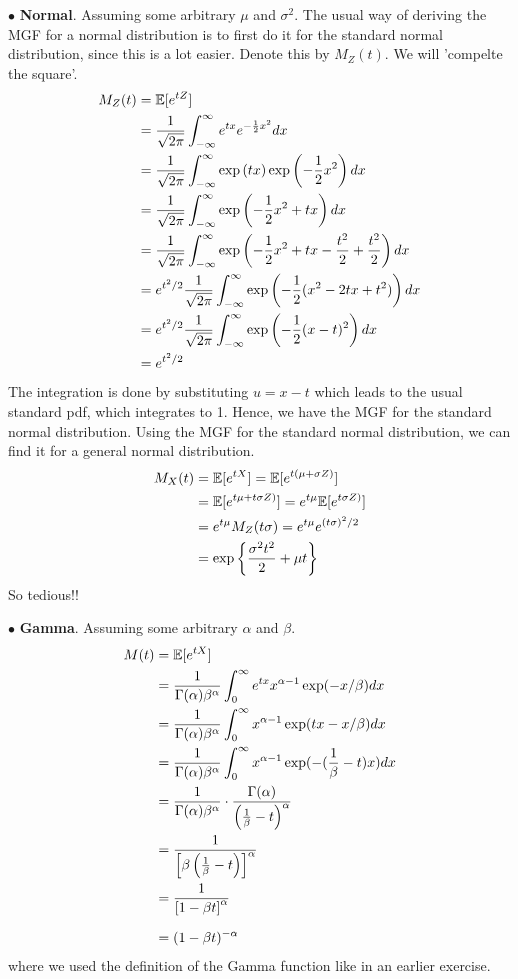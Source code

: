 \bigskip\noindent$\bullet$ \textbf{Normal}. Assuming some arbitrary $\mu$ and $\sigma^2$.
The usual way of deriving the MGF for a normal distribution is to first do it for
the standard normal distribution, since this is a lot easier. Denote this by $M_Z(t)$.
We will 'compelte the square'.
\begin{align*}
    M_Z(t) &= \mathbb{E}[e^{tZ}] \\
    &= \frac{1}{\sqrt{2\pi}}\int_{-\infty}^\infty e^{tx}e^{-\frac{1}{2}x^2}dx \\
    &= \frac{1}{\sqrt{2\pi}}\int_{-\infty}^\infty \exp\left(tx\right)\exp\left(-\frac{1}{2}x^2\right)dx\\
    &= \frac{1}{\sqrt{2\pi}}\int_{-\infty}^\infty \exp\left(-\frac{1}{2}x^2 + tx\right)dx\\
    &= \frac{1}{\sqrt{2\pi}}\int_{-\infty}^\infty \exp\left(-\frac{1}{2}x^2 + tx - \frac{t^2}{2} + \frac{t^2}{2} \right)dx\\
    &= e^{t^2/2}\frac{1}{\sqrt{2\pi}}\int_{-\infty}^\infty \exp\left(-\frac{1}{2}(x^2 - 2tx + t^2)\right)dx \\
    &= e^{t^2/2}\frac{1}{\sqrt{2\pi}}\int_{-\infty}^\infty \exp\left(-\frac{1}{2}(x - t)^2\right)dx \\
    &= e^{t^2/2}
\end{align*}
The integration is done by substituting $u = x-t$ which leads to the usual standard pdf, which
integrates to 1. Hence, we have the MGF for the standard normal distribution. Using the
MGF for the standard normal distribution, we can find it for a general normal distribution.
\begin{align*}
    M_X(t) &= \mathbb{E}[e^{tX}]
    = \mathbb{E}[e^{t(\mu + \sigma Z)}] \\
    &= \mathbb{E}[e^{t\mu + t\sigma Z)}]
    = e^{t\mu}\mathbb{E}[e^{t\sigma Z)}]\\
    &= e^{t\mu}M_Z(t\sigma) = e^{t\mu}e^{(t\sigma)^2/2} \\
    &= \exp\left\{\frac{\sigma^2 t^2}{2} + \mu t\right\}
\end{align*}
So tedious!!

\newpage\noindent
$\bullet$ \textbf{Gamma}. Assuming some arbitrary $\alpha$ and $\beta$.
\begin{align*}
    M(t) &= \E[e^{tX}] \\
    &= \frac{1}{\Gamma(\alpha)\beta^\alpha}\int_{0}^\infty e^{tx}x^{\alpha-1}\exp(-x/\beta)dx \\
    &= \frac{1}{\Gamma(\alpha)\beta^\alpha}\int_{0}^\infty x^{\alpha-1}\exp(tx-x/\beta)dx \\
    &= \frac{1}{\Gamma(\alpha)\beta^\alpha}\int_{0}^\infty x^{\alpha-1}\exp(-(\frac{1}{\beta} - t)x)dx \\
    &= \frac{1}{\Gamma(\alpha)\beta^\alpha}\cdot \frac{\Gamma(\alpha)}{\left(\frac{1}{\beta} - t\right)^\alpha} \\
    &= \frac{1}{\left[\beta\left(\frac{1}{\beta} - t\right)\right]^\alpha} \\
    &= \frac{1}{\left[1 - \beta t\right]^\alpha} \\ 
    &= \rule{0pt}{15pt}(1-\beta t)^{-\alpha}
\end{align*}
where we used the definition of the Gamma function like in an earlier exercise.

